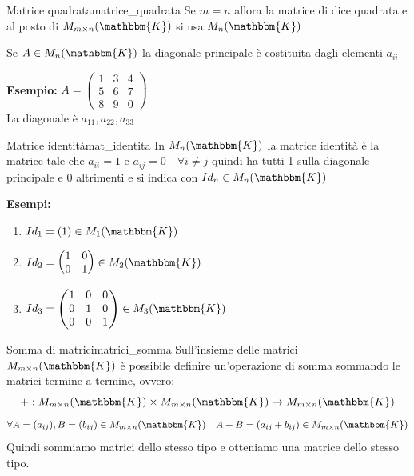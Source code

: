 \documentclass[12pt, letterpaper]{report}
\newcounter{definition}
\newcommand{\nmu}{}
\begin{document}
 		\begin{definition}{\nmu Matrice quadrata}{matrice_quadrata}
 			Se $m = n$ allora la matrice di dice quadrata e al posto di $M_{m \times n}(\mathbbm{K})$ si usa $M_n(\mathbbm{K})$
 		\end{definition}
 		 \begin{tcolorbox}[colframe=blue!75!black, colback=white!5!white, title=DEF di diagonale principale, fonttitle=\bfseries]
			Se $A \in M_n(\mathbbm{K})$ la diagonale principale è costituita dagli elementi $a_{ii}$
 		\end{tcolorbox}
 		\textbf{Esempio:} $A = \begin{pmatrix}
 			1 & 3 & 4 \\
 			5 & 6 & 7 \\
 			8 & 9 & 0
 		\end{pmatrix}$ \\
 		La diagonale è $a_{11}, a_{22}, a_{33}$
 		 \begin{definition}{\nmu Matrice identità}{mat_identita}
 			In $M_n(\mathbbm{K})$ la matrice identità è la matrice tale che $a_{ii} = 1$ e $a_{ij} = 0 \quad \forall i \neq j$ quindi ha tutti 1 sulla diagonale principale e 0 altrimenti e si indica con $Id_n \in M_n(\mathbbm{K})$
 		\end{definition}
 		\textbf{Esempi:}
 		\begin{enumerate}
 			\item $Id_1 = (1) \in M_1(\mathbbm{K})$
 			\item $Id_2 = \begin{pmatrix}
 				1 & 0 \\
 				0 & 1
 			\end{pmatrix} \in M_2(\mathbbm{K})$
 			\item $Id_3 = \begin{pmatrix}
 				1 & 0 & 0 \\
 				0 & 1 & 0 \\
 				0 & 0 & 1
 			\end{pmatrix} \in M_3(\mathbbm{K})$
 		\end{enumerate}
 		 \begin{definition}{\nmu Somma di matrici}{matrici_somma}
 			Sull'insieme delle matrici $M_{m \times n}(\mathbbm{K})$ è possibile definire un'operazione di somma sommando le matrici termine a termine, ovvero:
 			\[
 			+: M_{m \times n}(\mathbbm{K}) \times M_{m \times n}(\mathbbm{K}) \to M_{m \times n}(\mathbbm{K})
 			\]
 			\[
 			\forall A = (a_{ij}), B=(b_{ij}) \in M_{m \times n}(\mathbbm{K}) \quad A + B = (a_{ij} + b_{ij}) \in M_{m \times n}(\mathbbm{K})
 			\]
 			Quindi sommiamo matrici dello stesso tipo e otteniamo una matrice dello stesso tipo.
 		\end{definition}
\end{document}
